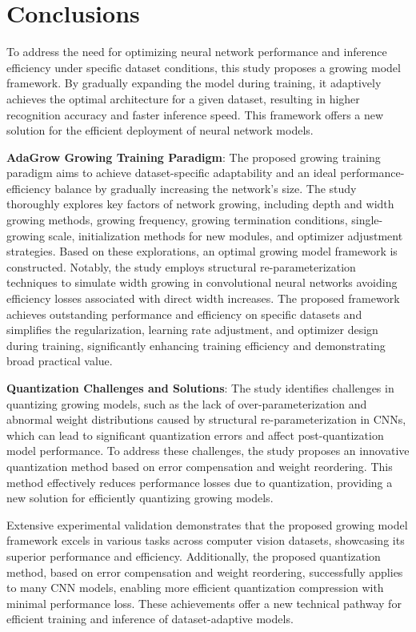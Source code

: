 \documentclass[preprint,12pt]{elsarticle}
\begin{document}
\section{Conclusions}

To address the need for optimizing neural network performance and inference efficiency under specific dataset conditions, this study proposes a growing model framework. By gradually expanding the model during training, it adaptively achieves the optimal architecture for a given dataset, resulting in higher recognition accuracy and faster inference speed. This framework offers a new solution for the efficient deployment of neural network models.

\textbf{AdaGrow Growing Training Paradigm}: The proposed growing training paradigm aims to achieve dataset-specific adaptability and an ideal performance-efficiency balance by gradually increasing the network's size. The study thoroughly explores key factors of network growing, including depth and width growing methods, growing frequency, growing termination conditions, single-growing scale, initialization methods for new modules, and optimizer adjustment strategies. Based on these explorations, an optimal growing model framework is constructed. Notably, the study employs structural re-parameterization techniques to simulate width growing in convolutional neural networks avoiding efficiency losses associated with direct width increases. The proposed framework achieves outstanding performance and efficiency on specific datasets and simplifies the regularization, learning rate adjustment, and optimizer design during training, significantly enhancing training efficiency and demonstrating broad practical value.

\textbf{Quantization Challenges and Solutions}: The study identifies challenges in quantizing growing models, such as the lack of over-parameterization and abnormal weight distributions caused by structural re-parameterization in CNNs, which can lead to significant quantization errors and affect post-quantization model performance. To address these challenges, the study proposes an innovative quantization method based on error compensation and weight reordering. This method effectively reduces performance losses due to quantization, providing a new solution for efficiently quantizing growing models.

Extensive experimental validation demonstrates that the proposed growing model framework excels in various tasks across computer vision datasets, showcasing its superior performance and efficiency. Additionally, the proposed quantization method, based on error compensation and weight reordering, successfully applies to many CNN models, enabling more efficient quantization compression with minimal performance loss. These achievements offer a new technical pathway for efficient training and inference of dataset-adaptive models.

 

\end{document}
